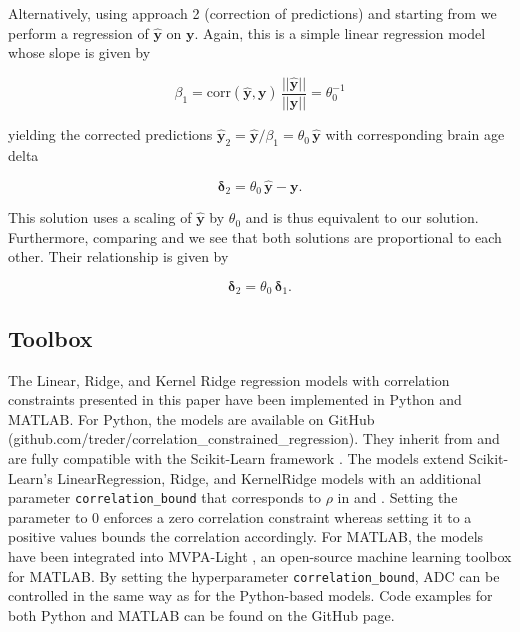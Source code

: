 \documentclass[utf8]{frontiersSCNS} %
\renewcommand{\a}{\theta}
\newcommand{\az}{\a_0}
\newcommand{\corr}{\text{corr}}
\renewcommand{\d}{\boldsymbol{\delta}}
\newcommand{\y}{\mathbf{y}}
\newcommand{\yh}{\mathbf{\hat{y}}}
\begin{document}
Alternatively, using approach 2 (correction of predictions) and starting from  we perform a regression of $\yh$ on $\y$. Again, this is a simple linear regression model whose slope is given by 

\[
\beta_1 = \corr(\yh, \y)\,\frac{||\yh||}{||\y||} = \az^{-1}
\]

yielding the corrected predictions $\yh_2 = \yh/\beta_1 = \az\,\yh$ with corresponding brain age delta

\begin{equation}\label{eq:approach2_solution2_d}
     \d_2 = \az\,\yh - \y.
\end{equation}

This solution uses a scaling of $\yh$ by $\az$ and is thus equivalent to our solution. Furthermore, comparing  and  we see that both solutions are proportional to each other. Their relationship is given by 

\begin{equation}\label{eq:approach1_vs_2_d}
     \d_2 = \az\,\d_1.
\end{equation}

\subsection{Toolbox}\label{sec:toolbox}

The Linear, Ridge, and Kernel Ridge regression models with correlation constraints presented in this paper have been implemented in Python and MATLAB. For Python, the models are available on GitHub (github.com/treder/correlation\_constrained\_regression). They inherit from and are fully compatible with the Scikit-Learn framework \citep{Pedregosa2011Scikit-learn:Python}. The models extend Scikit-Learn's LinearRegression, Ridge, and KernelRidge models with an additional parameter \verb|correlation_bound| that corresponds to $\rho$ in  and . Setting the parameter to 0 enforces a zero correlation constraint whereas setting it to a positive values bounds the correlation accordingly. For MATLAB, the models have been integrated into MVPA-Light  \citep{Treder2020MVPA-Light:Data}, an open-source machine learning toolbox for MATLAB. By setting the hyperparameter \verb|correlation_bound|, ADC can be controlled in the same way as for the Python-based models. Code examples for both Python and MATLAB can  be found on the GitHub page. 
\end{document}
